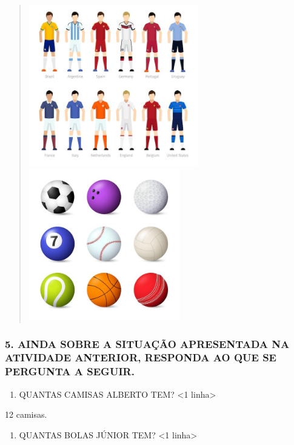 \begin{quote}
\includegraphics[width=2.90024in,height=2.77508in]{media/image5.jpg}\includegraphics[width=2.59375in,height=2.59375in]{media/image6.jpg}
\end{quote}


\subsubsection{5. AINDA SOBRE A SITUAÇÃO APRESENTADA NA ATIVIDADE ANTERIOR, RESPONDA AO QUE SE PERGUNTA A SEGUIR.}\label{responda-mais-perguntas-sobre-a-atividade-anterior}

\begin{enumerate}
\def\labelenumi{\Alph{enumi})}
\item
  QUANTAS CAMISAS ALBERTO TEM? \textless{}1 linha\textgreater{}
\end{enumerate}

12 camisas.

\begin{enumerate}
\def\labelenumi{\Alph{enumi})}
\item
  QUANTAS BOLAS JÚNIOR TEM? \textless{}1 linha\textgreater{}
\end{enumerate}

